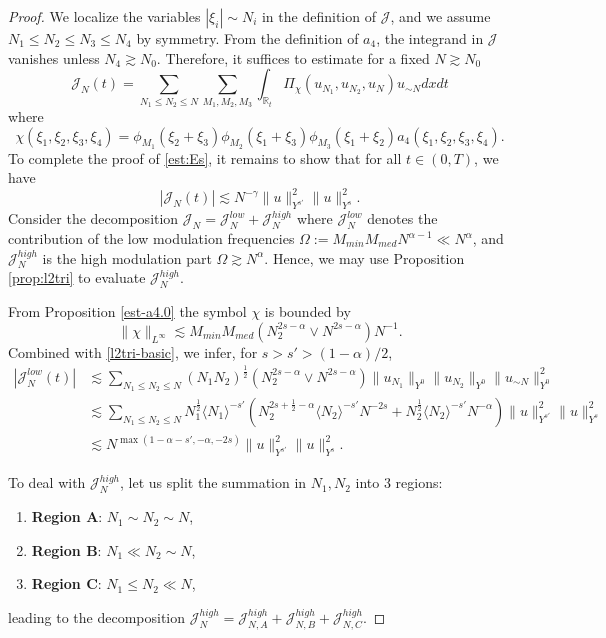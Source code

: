 \documentclass{amsart}
\theoremstyle{definition}
\theoremstyle{remark}
\def\R{{\mathbb R}}
\numberwithin{equation}{section}
\newcommand\cro[1]{\langle #1 \rangle}
\begin{document}
\begin{proof}
We localize the variables $|\xi_i|\sim N_i$ in the definition of $\mathcal{J}$, and we assume $N_1\le N_2\le N_3\le N_4$ by symmetry. From the definition of $a_4$, the integrand in $\mathcal{J}$ vanishes unless $N_4\gtrsim N_0$. Therefore, it suffices to estimate for a fixed $N\gtrsim N_0$
$$
\mathcal{J}_N(t) = \sum_{N_1\le N_2\le N} \sum_{M_1, M_2, M_3} \int_{\R_t} \Pi_\chi(u_{N_1}, u_{N_2}, u_{N}) u_{\sim N} dxdt
$$ 
where 
$$
\chi(\xi_1,\xi_2,\xi_3,\xi_4) = \phi_{M_1}(\xi_2+\xi_3)\phi_{M_2}(\xi_1+\xi_3)\phi_{M_3}(\xi_1+\xi_2) a_4(\xi_1,\xi_2,\xi_3,\xi_4).
$$
To complete the proof of \eqref{est:Es}, it remains to show that for all $t\in (0,T)$, we have
$$
|\mathcal{J}_N(t)| \lesssim N^{-\gamma} \|u\|_{Y^{s'}}^2\|u\|_{Y^s}^2.
$$
Consider the decomposition $\mathcal{J}_N = \mathcal{J}_N^{low} + \mathcal{J}_N^{high}$ where $\mathcal{J}_N^{low}$ denotes the contribution of the low modulation frequencies $\Omega:= M_{min}M_{med}N^{\alpha-1} \ll N^\alpha$, and $\mathcal{J}_N^{high}$ is the high modulation part $\Omega\gtrsim N^\alpha$. Hence, we may use Proposition \ref{prop:l2tri} to evaluate $\mathcal{J}_N^{high}$.
 
From Proposition \ref{est-a4.0} the symbol $\chi$ is bounded by
\begin{equation}\label{est-a4}
  \|\chi\|_{L^\infty} \lesssim M_{min} M_{med}(N_2^{2s-\alpha}\vee N^{2s-\alpha}) N^{-1}.
\end{equation}
Combined with \eqref{l2tri-basic}, we infer, for $s>s'>(1-\alpha)/2 $,
\begin{align*}
  |\mathcal{J}_N^{low}(t)| &\lesssim \sum_{N_1\le N_2\le N} (N_1N_2)^{\frac 12} (N_2^{2s-\alpha} \vee N^{2s-\alpha}) \|u_{N_1}\|_{Y^0} \|u_{N_2}\|_{Y^0} \|u_{\sim N}\|_{Y^0}^2 \\
  &\lesssim \sum_{N_1\le N_2\le N} N_1^{\frac 12}\cro{N_1}^{-s'} \left(N_2^{2s+\frac 12-\alpha}\cro{N_2}^{-s'}N^{-2s} + N_2^{\frac 12}\cro{N_2}^{-s'}N^{-\alpha}\right) \|u\|_{Y^{s'}}^2\|u\|_{Y^s}^2\\
  &\lesssim N^{\max(1-\alpha-s', -\alpha, -2s)}  \|u\|_{Y^{s'}}^2\|u\|_{Y^s}^2.
\end{align*}

To deal with $\mathcal{J}_N^{high}$, let us split the summation in $N_1,N_2$ into 3 regions:
\begin{enumerate}
  \item[$\bullet$] \textbf{Region A}: $N_1\sim N_2\sim N$,  
  \item[$\bullet$] \textbf{Region B}: $N_1\ll N_2\sim N$, 
  \item[$\bullet$] \textbf{Region C}: $N_1\le N_2\ll N$,
\end{enumerate} 
leading to the decomposition $\mathcal{J}_N^{high} = \mathcal{J}_{N,A}^{high} +\mathcal{J}_{N,B}^{high} + \mathcal{J}_{N,C}^{high}$.


\end{proof}
\end{document}
